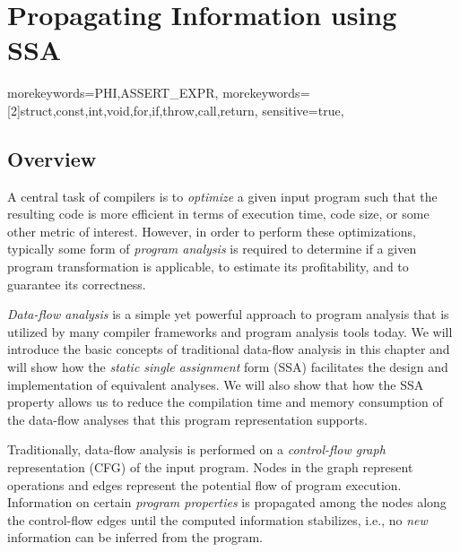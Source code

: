 \providecommand\lcode{\begingroup \small\urlstyle{tt}\Url}
\providecommand\lident{\begingroup \small\urlstyle{tt}\Url}

\chapter{Propagating Information using SSA}
\label{chapter:constant_propagation_is_easier}
\newcommand{\obacht}[2]{\marginpar{\tiny\textbf{#1:} #2}}

{
  morekeywords={PHI,ASSERT_EXPR},
  morekeywords=[2]{struct,const,int,void,for,if,throw,call,return},
  sensitive=true,
}

\lstset{
  mathescape=true,
  language=DNlisting,
  basicstyle=\small,
  keywordstyle=\ttfamily,
  keywordstyle=[2]\bfseries,
  numbers=left
}

\section{Overview}

A central task of compilers is to \emph{optimize} a given input program such
that the resulting code is more efficient in terms of execution time, code size,
or some other metric of interest. However, in order to perform these
optimizations, typically some form of \emph{program analysis} is
required to determine if a given program transformation is applicable, to
estimate its profitability, and to guarantee its correctness.

\emph{Data-flow analysis} is a simple yet powerful
approach to program analysis that is utilized by many compiler frameworks and
program analysis tools today. We will introduce the basic concepts of
traditional data-flow analysis in this chapter and will show how the \emph{static
single assignment} form (SSA) facilitates the design and implementation of
equivalent analyses.
We will also show that how the SSA property allows us to reduce the compilation
time and memory consumption of the data-flow analyses that this program
representation supports.

Traditionally, data-flow analysis is performed on a \emph{control-flow graph}
representation (CFG) of the input program. Nodes in the graph represent
operations and edges represent the potential flow of program execution.
Information on certain \emph{program properties} is propagated among
the nodes along the control-flow edges until the computed information
stabilizes, i.e., no \emph{new} information can be inferred from the program.

